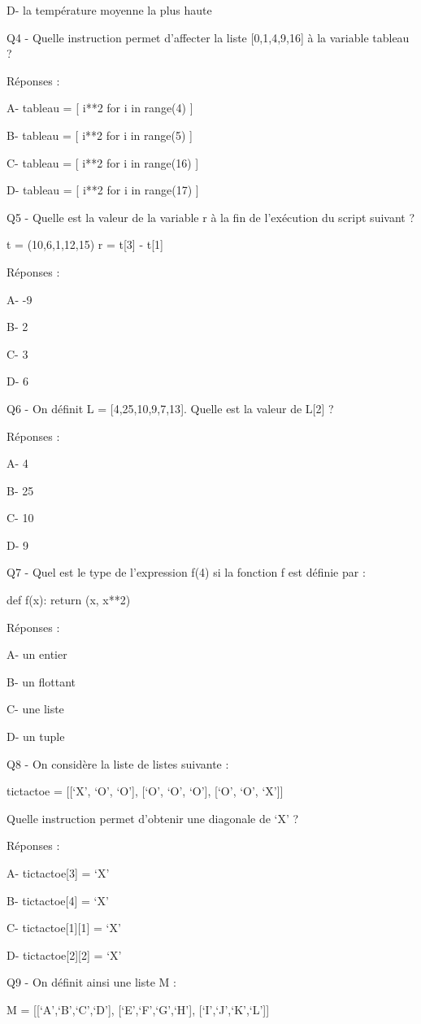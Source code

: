 \documentclass[
]{book}
\begin{document}
D- la température moyenne la plus haute

Q4 - Quelle instruction permet d'affecter la liste {[}0,1,4,9,16{]} à la variable tableau ?

Réponses :

A- tableau = {[} i**2 for i in range(4) {]}

B- tableau = {[} i**2 for i in range(5) {]}

C- tableau = {[} i**2 for i in range(16) {]}

D- tableau = {[} i**2 for i in range(17) {]}

Q5 - Quelle est la valeur de la variable r à la fin de l'exécution du script suivant ?

t = (10,6,1,12,15)
r = t{[}3{]} - t{[}1{]}

Réponses :

A- -9

B- 2

C- 3

D- 6

Q6 - On définit L = {[}4,25,10,9,7,13{]}. Quelle est la valeur de L{[}2{]} ?

Réponses :

A- 4

B- 25

C- 10

D- 9

Q7 - Quel est le type de l'expression f(4) si la fonction f est définie par :

def f(x):
return (x, x**2)

Réponses :

A- un entier

B- un flottant

C- une liste

D- un tuple

Q8 - On considère la liste de listes suivante :

tictactoe = {[}{[}`X', `O', `O'{]},
{[}`O', `O', `O'{]},
{[}`O', `O', `X'{]}{]}

Quelle instruction permet d'obtenir une diagonale de `X' ?

Réponses :

A- tictactoe{[}3{]} = `X'

B- tictactoe{[}4{]} = `X'

C- tictactoe{[}1{]}{[}1{]} = `X'

D- tictactoe{[}2{]}{[}2{]} = `X'

Q9 - On définit ainsi une liste M :

M = {[}{[}`A',`B',`C',`D'{]}, {[}`E',`F',`G',`H'{]}, {[}`I',`J',`K',`L'{]}{]}
\end{document}
